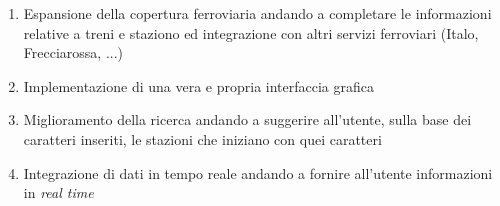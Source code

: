 \documentclass[italian,12pt,a4paper]{article}
\begin{document}
	\begin{enumerate}
		\item Espansione della copertura ferroviaria andando a completare le informazioni relative a treni e staziono ed integrazione con altri servizi ferroviari (Italo, Frecciarossa, ...)
		\item Implementazione di una vera e propria interfaccia grafica
		\item Miglioramento della ricerca andando a suggerire all'utente, sulla base dei caratteri inseriti, le stazioni che iniziano con quei caratteri
		\item Integrazione di dati in tempo reale andando a fornire all'utente informazioni in \textit{real time}

	\end{enumerate}
	\printbibliography
	
\end{document}
